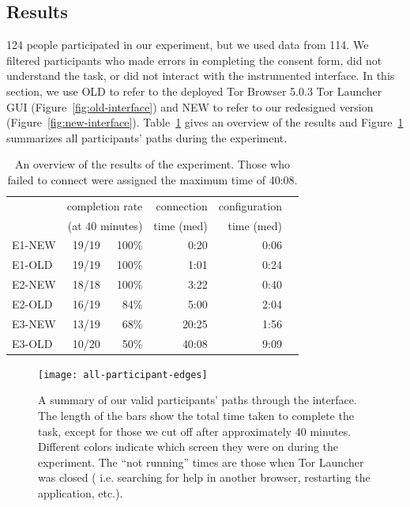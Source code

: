 \documentclass[USenglish,oneside,twocolumn]{article}
\begin{document}
\subsection{Results} 
124 people participated in our experiment, but we used data from 114. We filtered participants who made errors in completing the consent form, did not understand the task, or did not interact with the instrumented interface. In this section, we use OLD to refer to the deployed Tor Browser 5.0.3 Tor Launcher GUI (Figure~\ref{fig:old-interface}) and NEW to refer to our redesigned version (Figure~\ref{fig:new-interface}). Table~\ref{table:participant-summary} gives an overview of the results and Figure~\ref{fig:all-participant-edges} summarizes all participants' paths during the experiment.

\begin{table}[t]
\centering
\begin{tabular}{l r r r r r}
& \multicolumn{2}{r}{completion rate} & \multicolumn{1}{r}{connection} & \multicolumn{1}{r}{configuration} \\
& \multicolumn{2}{r}{(at 40 minutes)} & \multicolumn{1}{r}{time (med)} & \multicolumn{1}{r}{time (med)} \\
\noalign{\hrule}
E1-NEW & 19/19 & 100\% & 0:20 & 0:06 \\
E1-OLD & 19/19 & 100\% & 1:01 & 0:24 \\
E2-NEW & 18/18 & 100\% & 3:22 & 0:40 \\
E2-OLD & 16/19 & 84\% & 5:00 & 2:04 \\
E3-NEW & 13/19 & 68\% & 20:25 & 1:56 \\
E3-OLD & 10/20 & 50\% & 40:08 & 9:09 \\
\end{tabular}
\caption{
An overview of the results of the experiment. Those who
failed to connect were assigned the maximum time of 40:08.
}
\label{table:participant-summary}
\end{table}

\label{all-participant-edges} 
\begin{figure}
\centering
\texttt{[image: all-participant-edges]}
\caption{
A summary of our valid participants' paths through the interface.
The length of the bars show the total time taken to complete the task,
except for those we cut off after approximately 40 minutes.
Different colors indicate which screen they were on during the experiment.
The ``not running'' times are those when Tor Launcher was closed (
i.e. searching for help in another browser, restarting the application, etc.).
}
\label{fig:all-participant-edges}
\end{figure}
\end{document}

